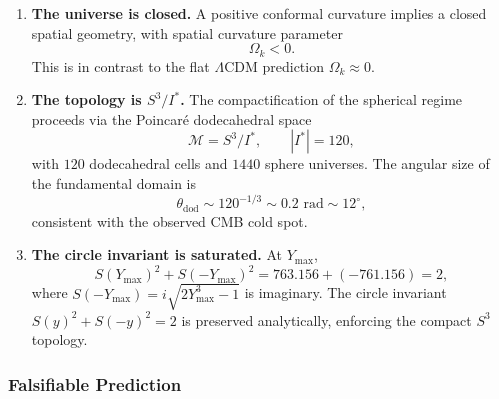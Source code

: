\documentclass[12pt,oneside,openany]{book}
\begin{document}
\begin{enumerate}
\item \textbf{The universe is closed.} A positive conformal curvature implies a closed spatial geometry, with spatial curvature parameter
\begin{equation}
\Omega_k < 0.
\label{eq:Omega-k}
\end{equation}
This is in contrast to the flat $\Lambda$CDM prediction $\Omega_k \approx 0$.

\item \textbf{The topology is $S^3/I^*$.} The compactification of the spherical regime proceeds via the Poincaré dodecahedral space
\begin{equation}
\mathcal{M} = S^3 / I^*, \qquad |I^*| = 120,
\label{eq:poincare}
\end{equation}
with $120$ dodecahedral cells and $1440$ sphere universes. The angular size of the fundamental domain is
\begin{equation}
\theta_{\mathrm{dod}} \sim 120^{-1/3} \sim 0.2 \text{ rad} \sim 12^\circ,
\label{eq:theta-dod}
\end{equation}
consistent with the observed CMB cold spot.

\item \textbf{The circle invariant is saturated.} At $Y_{\max}$,
\begin{equation}
S(Y_{\max})^2 + S(-Y_{\max})^2 = 763.156 + (-761.156) = 2,
\label{eq:circle-saturated}
\end{equation}
where $S(-Y_{\max}) = i\sqrt{2Y_{\max}^3 - 1}$ is imaginary. The circle invariant $S(y)^2 + S(-y)^2 = 2$ is preserved analytically, enforcing the compact $S^3$ topology.
\end{enumerate}

\subsubsection{Falsifiable Prediction}
\end{document}
